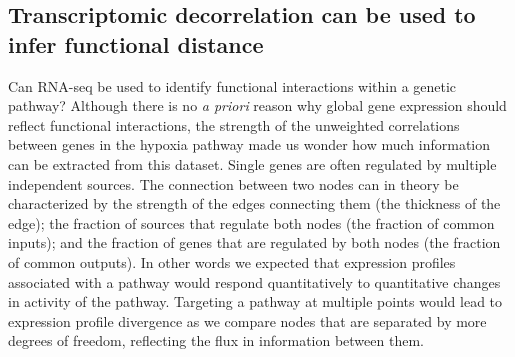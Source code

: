 \documentclass[9pt,twocolumn,twoside]{pnas-new}
\begin{document}
\subsection*{Transcriptomic decorrelation can be used to infer functional distance}
\label{sub:decorrelation}

Can RNA-seq be used to identify functional interactions within a genetic pathway?
Although there is no \emph{a
priori} reason why global gene expression should reflect functional interactions,
the strength of the unweighted correlations between genes in the hypoxia pathway
made us wonder how much information can be extracted from this dataset. Single
genes are often regulated by multiple independent sources. The connection between
two nodes can in theory be characterized by the strength of the edges connecting
them (the thickness of the edge); the fraction of sources that regulate both
nodes (the fraction of common inputs); and the fraction of genes that are
regulated by both nodes (the fraction of common outputs).
In other words we expected that expression profiles associated with a pathway
would respond quantitatively to quantitative changes in activity of the pathway.
Targeting a pathway at multiple points would lead to expression profile
divergence as we compare nodes that are separated by more degrees of freedom,
reflecting the flux in information between them.
\end{document}
